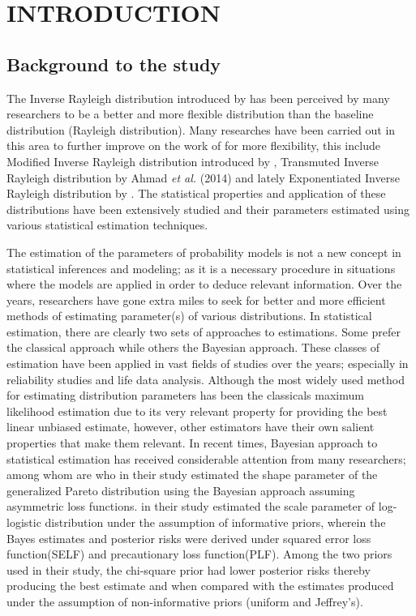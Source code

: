 \documentclass[a4paper,12pt]{report}
\newcommand{\para}{\hspace{0.5cm}}
\begin{document}
\pagebreak
\rmfamily
{} 	
\chapter{INTRODUCTION}
\section{Background to the study}
\justifying


\noindent\para The Inverse Rayleigh distribution introduced by \cite{trayer1964} has been perceived by many researchers to be a better and more flexible distribution than the baseline distribution (Rayleigh distribution). Many researches have been carried out in this area to further improve on the work of \cite{trayer1964} for more flexibility, this include Modified Inverse Rayleigh distribution introduced by \cite{muhammad2014}, Transmuted Inverse Rayleigh distribution by Ahmad \textit{et al.} (2014) and lately Exponentiated Inverse Rayleigh distribution by \cite{rao2019exponentiated}. The statistical properties and application of these distributions have been extensively studied and their parameters estimated using various statistical estimation techniques.

\noindent\para The estimation of the parameters of probability models is not a new concept in statistical inferences and modeling; as it is a necessary procedure in situations where the models are applied in order to deduce relevant information. Over the years, researchers have gone extra miles to seek for better and more efficient methods of estimating parameter(s) of various distributions. In statistical estimation, there are clearly two sets of approaches to estimations. Some prefer the classical approach while others the Bayesian approach. These classes of estimation have been applied in vast fields of studies over the years; especially in reliability studies and life data analysis. Although the most widely used method for estimating distribution parameters has been the classicals maximum likelihood estimation due to its very relevant property for providing the best linear unbiased estimate, however, other estimators have their own salient properties that make them relevant. In recent times, Bayesian approach to statistical estimation has received considerable attention from many researchers; among whom are \cite{pandey2009bayesian} who in their study estimated the shape parameter of the generalized Pareto distribution using the Bayesian approach assuming asymmetric loss functions. \cite{yahaya2017bayesian} in their study estimated the scale parameter of log-logistic distribution under the assumption of informative priors, wherein the Bayes estimates and posterior risks were derived under squared error loss function(SELF) and precautionary loss function(PLF). Among the two priors used in their study, the chi-square prior had lower posterior risks thereby producing the best estimate and when compared with the estimates produced under the assumption of non-informative priors (uniform and Jeffrey’s).
 
\end{document}
